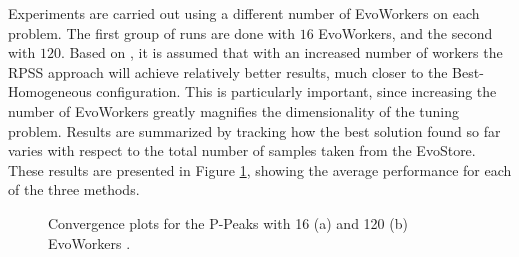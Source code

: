 Experiments are carried out using a different number of EvoWorkers on each problem.
The first group of runs are done with $16$ EvoWorkers, and the second with $120$.
Based on \cite{fuku1,fuku2}, it is assumed that with an increased number of workers the RPSS approach will achieve relatively better results, much closer to
the Best-Homogeneous configuration.
This is particularly important, since increasing the number of EvoWorkers greatly magnifies the dimensionality of the tuning problem.
Results are summarized by tracking how the best solution found so far varies with respect to the total
number of samples taken from the EvoStore.
These results are presented in Figure \ref{fig:PPeaks}, showing the average performance for each of the three methods.

\begin{figure}[t]
    \centering
    \caption{Convergence plots for the P-Peaks with 16 (a) and 120 (b)
      EvoWorkers .}
    \label{fig:PPeaks}
\end{figure}



